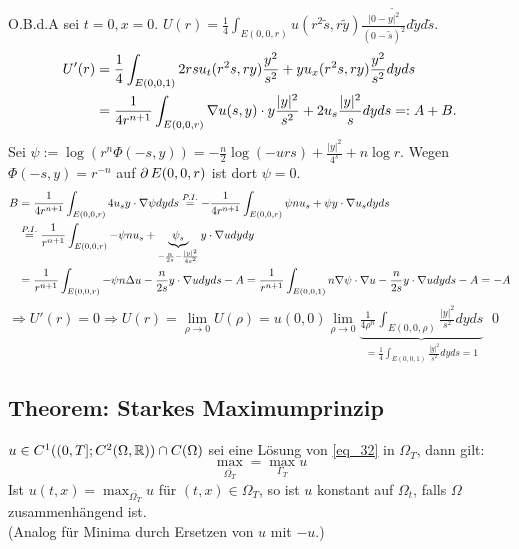 	O.B.d.A sei $t=0, x=0$. $U(r) = \frac{1}{4} \int_{E(0,0,r)} u(r^2 \tilde{s},r \tilde{y}) \frac{|0- \tilde{y|^2}}{(0-\tilde{s})^2} d\tilde{y} d\tilde{s}$. \\
	\begin{equation}
	\begin{aligned}
	U'(r) &= \frac{1}{4} \int_{E(0,0,1)} 2rs u_t(r^2 s,ry) \frac{y^2}{s^2} + yu_x(r^2s,ry) \frac{y^2}{s^2} dyds \\ \notag 
	&= \frac{1}{4r^{n+1}} \int_{E(0,0,r)} \nabla u(s,y) \cdot y \frac{|y|^2}{s^2} + 2u_s \frac{|y|^2}{s} dyds =: A+B.
	\end{aligned}
	\end{equation}
	Sei $\psi := \log(r^n \Phi(-s,y)) = -\frac{n}{2} \log (-urs) + \frac{|y|^2}{4^s} + n \log r$. Wegen $\Phi(-s,y) = r^{-n}$ auf $\operatorname{\partial} E(0,0,r)$ ist dort $\psi = 0$.
	\begin{equation}
	\begin{aligned}
		B &= \frac{1}{4r^{n+1}} \int_{E(0,0,r)} 4u_s y \cdot \nabla \psi dy ds \overset{P.I.}{=} -\frac{1}{4r^{n+1}} \int_{E(0,0,r)} \psi n u_s + \psi y \cdot \nabla u_s dy ds \\ \notag
		&\overset{P.I.}{=} \frac{1}{r^{n+1}} \int_{E(0,0,r)} -\psi n u_s + \underbrace{\psi_s}_{-\frac{n}{2s} - \frac{|y|^2}{4s^2}} y \cdot \nabla u dy dy \\
		&= \frac{1}{r^{n+1}} \int_{E(0,0,r)} -\psi n \Delta u - \frac{n}{2s} y \cdot \nabla u dy ds - A = \frac{1}{r^{n+1}} \int_{E(0,0,1)} n \nabla \psi \cdot \nabla u - \frac{n}{2s} y \cdot \nabla u dy ds -A = -A
	\end{aligned}
	\end{equation}
	$\Rightarrow U'(r) = 0 \Rightarrow U(r) = \lim\limits_{\rho \rightarrow 0} U(\rho) = u(0,0) \lim\limits_{\rho \rightarrow 0} \underbrace{\frac{1}{4\rho^n} \int_{E(0,0,\rho)} \frac{|y|^2}{s^2} dyds}_{=\frac{1}{4} \int_{E(0,0,1)} \frac{|y|^2}{s^2} dyds = 1}$ \qed

\subsection{Theorem: Starkes Maximumprinzip}
\label{thm_86}
	$u \in C^1((0,T];C^2(\Omega,\mathbb{R})) \cap C(\Omega)$ sei eine Lösung von \eqref{eq_32} in $\Omega_T$, dann gilt: \marginnote{[86]}
	\[ \max_{\overline{\Omega_T}} = \max_{\Gamma_T} u \]
	Ist $u(t,x) = \max_{\overline{\Omega_T}} u$ für $(t,x) \in \Omega_T$, so ist $u$ konstant auf $\Omega_t$, falls $\Omega$ zusammenhängend ist. \\
	(Analog für Minima durch Ersetzen von $u$ mit $-u$.)

